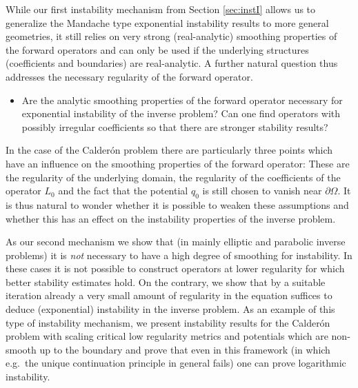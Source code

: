 \documentclass[12pt,twoside]{amsart}
\numberwithin{equation}{section}
\newcommand {\p} {\partial}
\begin{document}
While our first instability mechanism from Section \ref{sec:instI} allows us to generalize the Mandache type exponential instability results to more general geometries, it still relies on very strong (real-analytic) smoothing properties of the forward operators and can only be used if the underlying structures (coefficients and boundaries) are real-analytic. A further natural question thus addresses the necessary regularity of the forward operator. 

\begin{itemize}
\item[(Q3)] Are the analytic smoothing properties of the forward operator necessary for exponential instability of the inverse problem? Can one find operators with possibly irregular coefficients so that there are stronger stability results?
\end{itemize}

In the case of the Calder\'on problem there are particularly three points which have an influence on the smoothing properties of the forward operator: These are the regularity of the underlying domain, the regularity of the coefficients of the operator $L_0$ and the fact that the potential $q_0$ is still chosen to vanish near $\p \Omega$. It is thus natural to wonder whether it is possible to weaken these assumptions and whether this has an effect on the instability properties of the inverse problem.

As our second mechanism we show that (in mainly elliptic and parabolic inverse problems) it is \emph{not} necessary to have a high degree of smoothing for instability. In these cases it is not possible to construct operators at lower regularity for which better stability estimates hold.
On the contrary, we show that by a suitable iteration already a very small amount of regularity in the equation suffices to deduce (exponential) instability in the inverse problem. As an example of this type of instability mechanism, we present instability results for the Calder\'on problem with scaling critical low regularity metrics and potentials which are non-smooth up to the boundary and prove that even in this framework (in which e.g.\ the unique continuation principle in general fails) one can prove logarithmic instability.
\end{document}
